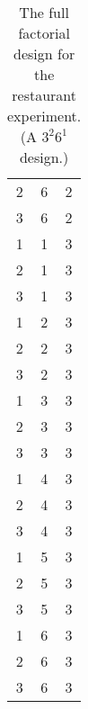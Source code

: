\documentclass{article}
\begin{document}
\begin{table}[!hb]
\begin{tabular}{ccc}
2 & 6 & 2\\
3 & 6 & 2\\
1 & 1 & 3\\
2 & 1 & 3\\
3 & 1 & 3\\
1 & 2 & 3\\
2 & 2 & 3\\
3 & 2 & 3\\
1 & 3 & 3\\
2 & 3 & 3\\
3 & 3 & 3\\
1 & 4 & 3\\
2 & 4 & 3\\
3 & 4 & 3\\
1 & 5 & 3\\
2 & 5 & 3\\
3 & 5 & 3\\
1 & 6 & 3\\
2 & 6 & 3\\
3 & 6 & 3\\
\bottomrule
\end{tabular}
\caption{The full factorial design for the restaurant experiment. (A $3^2 6^1$ design.)}
\label{tab:restaurant-full-factorial}
\end{table}



\end{document}
